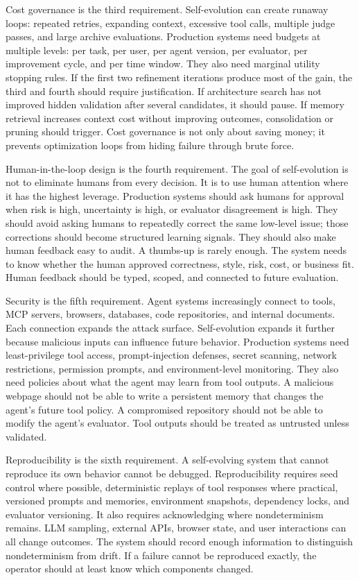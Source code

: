 Cost governance is the third requirement. Self-evolution can create runaway loops: repeated retries, expanding context, excessive tool calls, multiple judge passes, and large archive evaluations. Production systems need budgets at multiple levels: per task, per user, per agent version, per evaluator, per improvement cycle, and per time window. They also need marginal utility stopping rules. If the first two refinement iterations produce most of the gain, the third and fourth should require justification. If architecture search has not improved hidden validation after several candidates, it should pause. If memory retrieval increases context cost without improving outcomes, consolidation or pruning should trigger. Cost governance is not only about saving money; it prevents optimization loops from hiding failure through brute force.

Human-in-the-loop design is the fourth requirement. The goal of self-evolution is not to eliminate humans from every decision. It is to use human attention where it has the highest leverage. Production systems should ask humans for approval when risk is high, uncertainty is high, or evaluator disagreement is high. They should avoid asking humans to repeatedly correct the same low-level issue; those corrections should become structured learning signals. They should also make human feedback easy to audit. A thumbs-up is rarely enough. The system needs to know whether the human approved correctness, style, risk, cost, or business fit. Human feedback should be typed, scoped, and connected to future evaluation.

Security is the fifth requirement. Agent systems increasingly connect to tools, MCP servers, browsers, databases, code repositories, and internal documents. Each connection expands the attack surface. Self-evolution expands it further because malicious inputs can influence future behavior. Production systems need least-privilege tool access, prompt-injection defenses, secret scanning, network restrictions, permission prompts, and environment-level monitoring. They also need policies about what the agent may learn from tool outputs. A malicious webpage should not be able to write a persistent memory that changes the agent's future tool policy. A compromised repository should not be able to modify the agent's evaluator. Tool outputs should be treated as untrusted unless validated.

Reproducibility is the sixth requirement. A self-evolving system that cannot reproduce its own behavior cannot be debugged. Reproducibility requires seed control where possible, deterministic replays of tool responses where practical, versioned prompts and memories, environment snapshots, dependency locks, and evaluator versioning. It also requires acknowledging where nondeterminism remains. LLM sampling, external APIs, browser state, and user interactions can all change outcomes. The system should record enough information to distinguish nondeterminism from drift. If a failure cannot be reproduced exactly, the operator should at least know which components changed.

